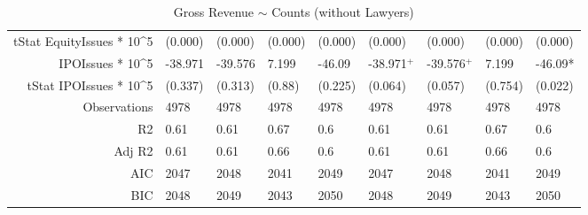 \begin{table}[ht]
\begin{tabular}{rllllllll}
  tStat EquityIssues * 10^5 & (0.000) & (0.000) & (0.000) & (0.000) & (0.000) & (0.000) & (0.000) & (0.000) \\ 
  IPOIssues * 10^5 & -38.971 & -39.576 & 7.199 & -46.09 & -38.971$^{+}$ & -39.576$^{+}$ & 7.199 & -46.09* \\ 
  tStat IPOIssues * 10^5 & (0.337) & (0.313) & (0.88) & (0.225) & (0.064) & (0.057) & (0.754) & (0.022) \\ 
  Observations & 4978 & 4978 & 4978 & 4978 & 4978 & 4978 & 4978 & 4978 \\ 
  R2 & 0.61 & 0.61 & 0.67 & 0.6 & 0.61 & 0.61 & 0.67 & 0.6 \\ 
  Adj R2 & 0.61 & 0.61 & 0.66 & 0.6 & 0.61 & 0.61 & 0.66 & 0.6 \\ 
  AIC & 2047 & 2048 & 2041 & 2049 & 2047 & 2048 & 2041 & 2049 \\ 
  BIC & 2048 & 2049 & 2043 & 2050 & 2048 & 2049 & 2043 & 2050 \\ 
   \hline
\end{tabular}
\caption{Gross Revenue $\sim$ Counts (without Lawyers)} 
\end{table}
